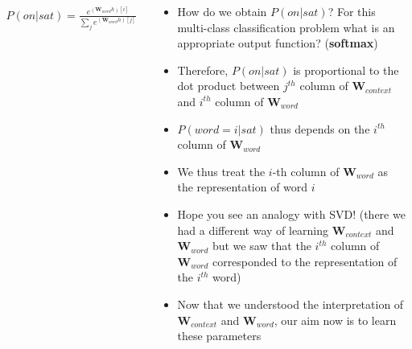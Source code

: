 \begin{frame}
	\begin{columns}
		\begin{overlayarea}{\textwidth}{\textheight}
			
			\vspace{-15mm}
			 {
				\begin{align*}
					P(on|sat) = \frac{e^{(\mathbf{W}_{word}h)[i]}}{\sum_j e^{(\mathbf{W}_{word}h)[j]}}
				\end{align*}
			}
		\end{overlayarea}
		\column{0.5\textwidth}
		\begin{overlayarea}{\textwidth}{\textheight}
			\footnotesize{
			\begin{itemize}
				\justifying
				\item<1-> How do we obtain $P(on|sat)$? For this multi-class classification problem what is an appropriate output function? \onslide<2-> {(\textbf{softmax})}
				\item <4-> Therefore, $P(on|sat)$ is proportional to the dot product between $j^{th}$ column of $\mathbf{W}_{context}$ and $i^{th}$ column of $\mathbf{W}_{word}$
				\item<5-> $P(word=i|sat)$ thus depends on the $i^{th}$ column of $\mathbf{W}_{word}$
				\item<6-> We thus treat the $i$-th column of $\mathbf{W}_{word}$ as the representation of word $i$
				\item<7-> Hope you see an analogy with SVD! (there we had a different way of learning $\mathbf{W}_{context}$ and $\mathbf{W}_{word}$ but we saw that the $i^{th}$ column of $\mathbf{W}_{word}$ corresponded to the representation of the $i^{th}$ word)
				\item<8-> Now that we understood the interpretation of $\mathbf{W}_{context}$ and $\mathbf{W}_{word}$, our aim now is to learn these parameters
			\end{itemize}
			}
		\end{overlayarea}
	\end{columns}
\end{frame}


